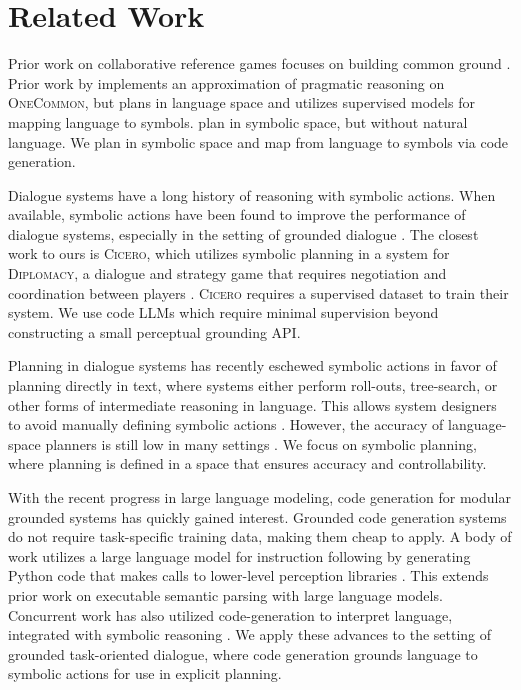 \documentclass[11pt]{article}
\newcommand{\celine}[1]{{{\textcolor{blue}{(Celine: #1)}}}}
\begin{document}

\section{Related Work}
Prior work on collaborative reference games focuses on building common ground
\citep{mf,pb,pip}.
Prior work by \citet{fried} implements an approximation of pragmatic reasoning on \textsc{OneCommon}, but plans in language space and utilizes supervised models for mapping language to symbols.
\citet{pip} plan in symbolic space, but without natural language. 
We plan in symbolic space and map from language to symbols via code generation.

Dialogue systems have a long history of reasoning with symbolic actions.
When available, symbolic actions have been found to improve
the performance of dialogue systems, especially in the setting of grounded dialogue \citep{winograd,young2006pomdp,he2018dnd,sm,cicero}.
The closest work to ours is \textsc{Cicero}, which utilizes symbolic planning in a system for \textsc{Diplomacy},
a dialogue and strategy game that requires negotiation and coordination between players \citep{cicero}.
\textsc{Cicero} requires a supervised dataset to train their system.
We use code LLMs which require minimal supervision beyond constructing a small perceptual grounding API.

Planning in dialogue systems has recently eschewed symbolic actions in favor of
planning directly in text, 
where systems either perform roll-outs, tree-search, or other forms of intermediate reasoning in language.
This allows system designers to avoid manually defining symbolic actions \citep{yarats2017rollout,jang2020bapomdp,gandhi2023strategic}.
However, the accuracy of language-space planners is still low in many settings \citep{fried,valmeekam2023planning}.
We focus on symbolic planning, where planning is defined in a space that ensures accuracy and controllability. %

With the recent progress in large language modeling,
code generation for modular grounded systems has quickly gained interest.
Grounded code generation systems do not require task-specific training data, 
making them cheap to apply.
A body of work utilizes a large language model for instruction following
by generating Python code that makes calls to lower-level perception libraries
\citep{codeaspolicies2022,vipergpt,gupta2022visual,gao2023pal}.
This extends prior work on executable semantic parsing \citep{liang2016learning,johnson2017inferring,cheng2018learning} with large language models.
Concurrent work has also utilized code-generation to interpret language, integrated with symbolic reasoning \citep{wong2023word}.
We apply these advances to the setting of grounded task-oriented dialogue,
where code generation grounds language to symbolic actions for use in
explicit planning.
\end{document}
